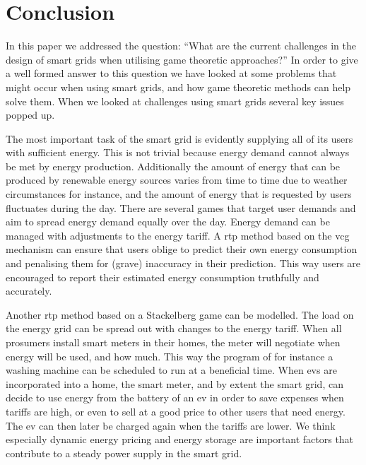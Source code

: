 \section{Conclusion}\label{conclusion}
\acresetall
In this paper we addressed the question: ``What are the current challenges in the design of smart grids when utilising game theoretic approaches?'' In order to give a well formed answer to this question we have looked at some problems that might occur when using smart grids, and how game theoretic methods can help solve them. When we looked at challenges using smart grids several key issues popped up. 

The most important task of the smart grid is evidently supplying all of its users with sufficient energy. This is not trivial because energy demand cannot always be met by energy production. Additionally the amount of energy that can be produced by renewable energy sources varies from time to time due to weather circumstances for instance, and the amount of energy that is requested by users fluctuates during the day. There are several games that target user demands and aim to spread energy demand equally over the day. Energy demand can be managed with adjustments to the energy tariff. A \ac{rtp} method based on the \ac{vcg} mechanism can ensure that users oblige to predict their own energy consumption and penalising them for (grave) inaccuracy in their prediction. This way users are encouraged to report their estimated energy consumption truthfully and accurately. 

Another \ac{rtp} method based on a Stackelberg game can be modelled. The load on the energy grid can be spread out with changes to the energy tariff. When all prosumers install smart meters in their homes, the meter will negotiate when energy will be used, and how much. This way the program of for instance a washing machine can be scheduled to run at a beneficial time. When \acp{ev} are incorporated into a home, the smart meter, and by extent the smart grid, can decide to use energy from the battery of an \ac{ev} in order to save expenses when tariffs are high, or even to sell at a good price to other users that need energy. The \ac{ev} can then later be charged again when the tariffs are lower. 
We think especially dynamic energy pricing and energy storage are important factors that contribute to a steady power supply in the smart grid.

